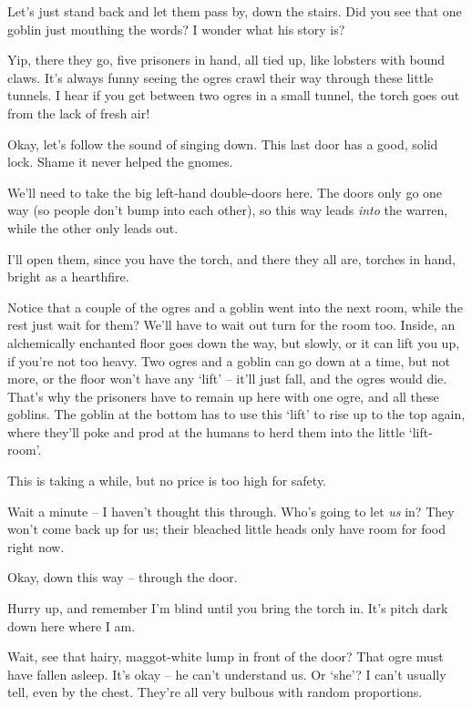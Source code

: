 \begin{multicols}{2}
\begin{exampletext}
Let's just stand back and let them pass by, down the stairs.
Did you see that one goblin just mouthing the words?
I wonder what his story is?

Yip, there they go, five prisoners in hand, all tied up, like lobsters with bound claws.
It's always funny seeing the ogres crawl their way through these little tunnels.
I hear if you get between two ogres in a small tunnel, the torch goes out from the lack of fresh air!

Okay, let's follow the sound of singing down.
This last door has a good, solid lock.
Shame it never helped the gnomes.

We'll need to take the big left-hand double-doors here.
The doors only go one way (so people don't bump into each other), so this way leads \emph{into} the warren, while the other only leads out.

I'll open them, since you have the torch, and there they all are, torches in hand, bright as a hearthfire.

Notice that a couple of the ogres and a goblin went into the next room, while the rest just wait for them?
We'll have to wait out turn for the room too.
Inside, an alchemically enchanted floor goes down the way, but slowly, or it can lift you up, if you're not too heavy.
Two ogres and a goblin can go down at a time, but not more, or the floor won't have any `lift' -- it'll just fall, and the ogres would die.
That's why the prisoners have to remain up here with one ogre, and all these goblins.
The goblin at the bottom has to use this `lift' to rise up to the top again, where they'll poke and prod at the humans to herd them into the little `lift-room'.

This is taking a while, but no price is too high for safety.


Wait a minute -- I haven't thought this through.
Who's going to let \emph{us} in?
They won't come back up for us; their bleached little heads only have room for food right now.

Okay, down this way -- through the door.

Hurry up, and remember I'm blind until you bring the torch in.
It's pitch dark down here where I am.

Wait, see that hairy, maggot-white lump in front of the door?
That ogre must have fallen asleep.
It's okay -- he can't understand us.
Or `she'?
I can't usually tell, even by the chest.
They're all very bulbous with random proportions.


\end{exampletext}
\end{multicols}

